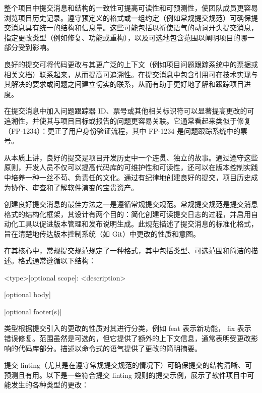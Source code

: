 
整个项目中提交消息和结构的一致性可提高可读性和可预测性，使团队成员更容易浏览项目历史记录。遵守预定义的格式或一组约定（例如常规提交规范）可确保提交消息具有统一的结构和信息量。这些可能包括以祈使语气的动词开头提交消息，指定更改类型（例如修复、功能或重构），以及可选地包含范围以阐明项目的哪一部分受到影响。


良好的提交可将代码更改与其更广泛的上下文（例如项目问题跟踪系统中的票据或相关文档）联系起来，从而提高可追溯性。在提交消息中包含引用可在技术实现与其解决的要求或问题之间建立切实的联系，从而有助于更好地了解和跟踪项目进度。

在提交消息中加入问题跟踪器 ID、票号或其他相关标识符可以显著提高更改的可追溯性，并使其与项目目标或报告的问题更容易关联。它通常看起来类似于修复（FP-1234）：更正了用户身份验证流程，其中 FP-1234 是问题跟踪系统中的票号。

从本质上讲，良好的提交是项目开发历史中一个连贯、独立的故事。通过遵守这些原则，开发人员不仅可以提高代码库的可维护性和可读性，还可以在版本控制实践中培养一种一丝不苟、负责任的文化。通过有纪律地创建良好的提交，项目历史成为协作、审查和了解软件演变的宝贵资产。

创建良好提交消息的最佳方法之一是遵循常规提交规范。常规提交规范是提交消息格式的结构化框架，其设计有两个目的：简化创建可读提交日志的过程，并启用自动化工具以促进版本管理和发布说明生成。此规范描述了提交消息的标准化格式，旨在清楚地传达版本控制系统（如 Git）中更改的性质和意图。


在其核心中，常规提交规范规定了一种格式，其中包括类型、可选范围和简洁的描述。格式通常遵循以下结构：

\begin{shell}
<type>[optional scope]: <description>

[optional body]

[optional footer(s)]
\end{shell}

类型根据提交引入的更改的性质对其进行分类，例如 feat 表示新功能， fix 表示错误修复。范围虽然是可选的，但它提供了额外的上下文信息，通常表明受更改影响的代码库部分。描述以命令式的语气提供了更改的简明摘要。


提交 linting（尤其是在遵守常规提交规范的情况下）可确保提交的结构清晰、可预测且有用。以下是一些符合提交 linting 规则的提交示例，展示了软件项目中可能发生的各种类型的更改：

